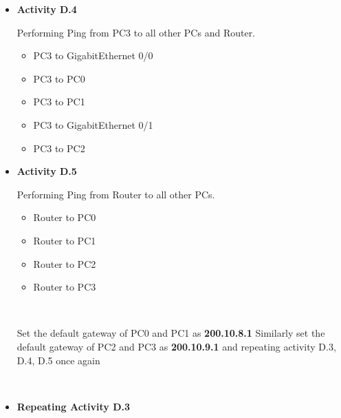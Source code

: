 \documentclass[a4paper,12pt]{article}
\begin{document}
\begin{itemize}
      \item \textbf{Activity D.4}

            Performing Ping from PC3 to all other PCs and Router.
            \begin{itemize}
                  \item PC3 to GigabitEthernet 0/0
                  \item PC3 to PC0
                  \item PC3 to PC1
                  \item PC3 to GigabitEthernet 0/1
                  \item PC3 to PC2
            \end{itemize}


      \item \textbf{Activity D.5}

            Performing Ping from Router to all other PCs.
            \begin{itemize}
                  \item Router to PC0
                  \item Router to PC1
                  \item Router to PC2
                  \item Router to PC3
            \end{itemize}

            \HRule\\
            \HRule

            {\large Set the default gateway of PC0 and PC1 as \textbf{200.10.8.1} Similarly set the default gateway of PC2 and PC3 as \textbf{200.10.9.1 }and repeating activity D.3, D.4, D.5 once again }

            \HRule\\
            \HRule
      \item \textbf{Repeating Activity D.3}


\end{itemize}
\end{document}
